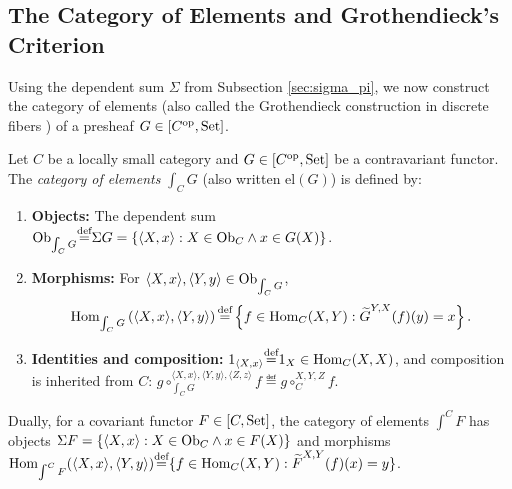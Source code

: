 \documentclass[10pt,a4paper]{article}
\begin{document}
\subsection{The Category of Elements and Grothendieck's Criterion}\label{sec:cat_elements}
Using the dependent sum $\Sigma$ from Subsection \ref{sec:sigma_pi}, we now construct the category of elements (also called the Grothendieck construction in discrete fibers \cite{SGA4,MacLane1998,Riehl2016}) of a presheaf $G \in [C^{\textrm{op}}, {\textrm{Set}}]$.

\begin{definition}\label{def:cat_of_elements}
Let $C$ be a locally small category and $G \in [C^{\textrm{op}}, {\textrm{Set}}]$ be a contravariant functor. The \emph{category of elements} $\int_C G$ (also written $\mathrm{el}(G)$) is defined by:
\begin{enumerate}
\item \textbf{Objects:} The dependent sum ${\textrm{Ob}}_{\int_C G} {\stackrel{{\textrm{def}}}{=}} \Sigma G = \{\langle X, x \rangle : X \in {\textrm{Ob}}_C \land x \in G(X)\}$.
\item \textbf{Morphisms:} For $\langle X, x \rangle, \langle Y, y \rangle \in {\textrm{Ob}}_{\int_C G}$,
$${\textrm{Hom}}_{\int_C G}\left(\langle X, x \rangle, \langle Y, y \rangle\right) {\stackrel{{\textrm{def}}}{=}} \left\{ f \in {\textrm{Hom}}_C(X, Y) : {\widetilde{G}\textrm{}}^{Y,X}(f)(y) = x \right\}.$$
\item \textbf{Identities and composition:} $1_{\langle X, x \rangle} {\stackrel{{\textrm{def}}}{=}} 1_X \in {\textrm{Hom}}_C(X,X)$, and composition is inherited from $C$: $g \circ_{\int_C G}^{\langle X,x\rangle,\langle Y,y\rangle,\langle Z,z\rangle} f \eqdef g \circ_C^{X,Y,Z} f$.
\end{enumerate}
Dually, for a covariant functor $F \in [C, {\textrm{Set}}]$, the category of elements $\int^C F$ has objects $\Sigma F = \{\langle X, x \rangle : X \in {\textrm{Ob}}_C \land x \in F(X)\}$ and morphisms ${\textrm{Hom}}_{\int^C F}(\langle X, x \rangle, \langle Y, y \rangle) {\stackrel{{\textrm{def}}}{=}} \{f \in {\textrm{Hom}}_C(X, Y) : {\widetilde{F}\textrm{}}^{X,Y}(f)(x) = y\}$.
\end{definition}
\end{document}
